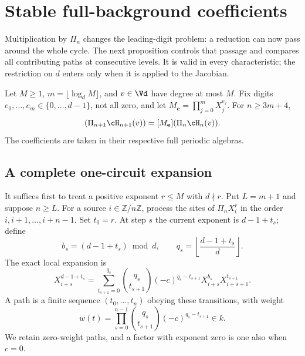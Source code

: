 \section{Stable full-background coefficients}
\label{sec:carry}

Multiplication by $\Pi_n$ changes the leading-digit problem: a
reduction can now pass around the whole cycle. The next proposition
controls that passage and compares all contributing paths at
consecutive levels. It is valid in every characteristic; the
restriction on $d$ enters only when it is applied to the Jacobian.

\begin{proposition}
\label{prop:stabilization}
Let $M\ge1$, $m=\lfloor\log_dM\rfloor$, and
$v\in\Vd$ have degree at most $M$. Fix digits
$e_0,\ldots,e_m\in\{0,\ldots,d-1\}$, not all zero, and
let $M_{\mathbf e}=\prod_{j=0}^mX_j^{e_j}$. For $n\ge3m+4$,
\begin{equation}
 [M_{\mathbf e}](\Pi_{n+1}\cH_{n+1}(v))
       =[M_{\mathbf e}](\Pi_n\cH_n(v)).
 \label{eq:stabilization}
\end{equation}
The coefficients are taken in their respective full periodic algebras.
\end{proposition}

\subsection{A complete one-circuit expansion}

It suffices first to treat a positive exponent $r\le M$ with
$d\nmid r$. Put $L=m+1$ and suppose $n\ge L$. For a source
$i\in\mathbb Z/n\mathbb Z$, process the sites of
$\Pi_nX_i^r$ in the order $i,i+1,\ldots,i+n-1$. Set $t_0=r$.
At step $s$ the current exponent is $d-1+t_s$; define
\begin{equation}
 b_s=(d-1+t_s)\bmod d,\qquad
 q_s=\left\lfloor\frac{d-1+t_s}{d}\right\rfloor.
 \label{eq:carry-quotient}
\end{equation}
The exact local expansion is
\begin{equation}
 X_{i+s}^{d-1+t_s}
   =\sum_{t_{s+1}=0}^{q_s}
      \binom{q_s}{t_{s+1}}(-c)^{q_s-t_{s+1}}
      X_{i+s}^{b_s}X_{i+s+1}^{t_{s+1}}.
 \label{eq:carry-expansion}
\end{equation}
A path is a finite sequence $(t_0,\ldots,t_n)$ obeying these
transitions, with weight
\begin{equation}
 w(t)=\prod_{s=0}^{n-1}
      \binom{q_s}{t_{s+1}}(-c)^{q_s-t_{s+1}}\in k.
 \label{eq:carry-weight}
\end{equation}
We retain zero-weight paths, and a factor with exponent zero is
one also when $c=0$.

